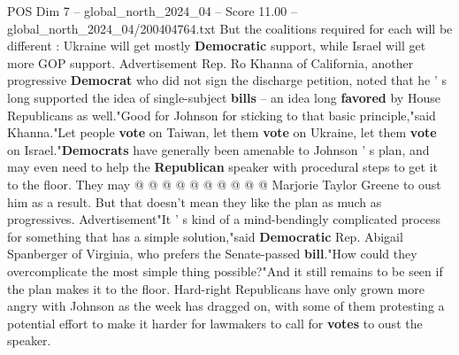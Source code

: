 \begin{textsample}{POS Dim 7 – global\_north\_2024\_04 – Score 11.00 – global\_north\_2024\_04/200404764.txt}
But the coalitions required for each will be different : Ukraine will get mostly \textbf{Democratic} support, while Israel will get more GOP support.
Advertisement Rep.
Ro Khanna of California, another progressive \textbf{Democrat} who did not sign the discharge petition, noted that he ' s long supported the idea of single-subject \textbf{bills} -- an idea long \textbf{favored} by House Republicans as well."Good for Johnson for sticking to that basic principle,"said Khanna."Let people \textbf{vote} on Taiwan, let them \textbf{vote} on Ukraine, let them \textbf{vote} on Israel."\textbf{Democrats} have generally been amenable to Johnson ' s plan, and may even need to help the \textbf{Republican} speaker with procedural steps to get it to the floor.
They may @ @ @ @ @ @ @ @ @ @ Marjorie Taylor Greene to oust him as a result.
But that doesn't mean they like the plan as much as progressives.
Advertisement"It ' s kind of a mind-bendingly complicated process for something that has a simple solution,"said \textbf{Democratic} Rep.
Abigail Spanberger of Virginia, who prefers the Senate-passed \textbf{bill}."How could they overcomplicate the most simple thing possible?"And it still remains to be seen if the plan makes it to the floor.
Hard-right Republicans have only grown more angry with Johnson as the week has dragged on, with some of them protesting a potential effort to make it harder for lawmakers to call for \textbf{votes} to oust the speaker.

\end{textsample}
